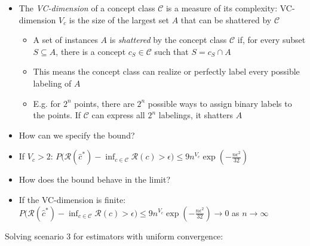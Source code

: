 \begin{itemize}
    \item The \emph{VC-dimension} of a concept class $\mathcal{C}$ is a measure of its complexity: VC-dimension $V_c$ is the size of the largest set $A$ that can be shattered by $\mathcal{C}$
    \begin{itemize}
        \item A set of instances $A$ is \emph{shattered} by the concept class $\mathcal{C}$ if, for every subset $S \subseteq A$, there is a concept $c_S \in \mathcal{C}$ such that $S = c_S \cap A$
        \item This means the concept class can realize or perfectly label every possible labeling of $A$
        \item E.g. for $2^n$ points, there are $2^n$ possible ways to assign binary labels to the points. If $\mathcal{C}$ can express all $2^n$ labelings, it shatters $A$
    \end{itemize}
    \item How can we specify the bound?
    \item If $V_c > 2$:
    $
    P\big(\mathcal{R}(\hat{c}^*) - \inf_{c \in \mathcal{C}} \mathcal{R}(c) > \epsilon\big) \leq 9  n^{V_c} \exp\left(-\frac{n \epsilon^2}{32}\right)
    $
    \item How does the bound behave in the limit?
    \item If the VC-dimension is finite:
    $
    P\big(\mathcal{R}(\hat{c}^*) - \inf_{c \in \mathcal{C}} \mathcal{R}(c) > \epsilon\big) \leq 9 n^{V_c} \exp\left(-\frac{n \epsilon^2}{32}\right) \to 0$ as $n \to \infty$
\end{itemize}
Solving scenario 3 for estimators with uniform convergence: 
